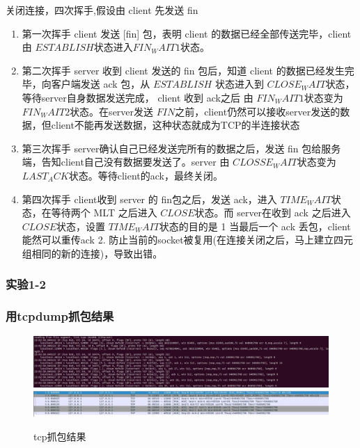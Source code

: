 \documentclass[a4paper,UTF8]{ctexart}
\begin{document}
		\par 关闭连接，四次挥手,假设由 client 先发送 fin
		\begin{enumerate}
		\item 第一次挥手 client 发送 [fin] 包，表明 client 的数据已经全部传送完毕，client 由 $ESTABLISH$状态进入$FIN_WAIT1$状态。
		\item 第二次挥手 server 收到 client 发送的 fin 包后，知道 client 的数据已经发生完毕，向客户端发送 ack 包，从 $ESTABLISH$ 状态进入到 $CLOSE_WAIT$状态，等待server自身数据发送完成， client 收到 ack之后 由 $FIN_WAIT1$状态变为$FIN_WAIT2$状态。在server发送 $FIN$之前，client仍然可以接收server发送的数据，但client不能再发送数据，这种状态就成为TCP的半连接状态
		\item 第三次挥手 server确认自己已经发送完所有的数据之后，发送 fin 包给服务端，告知client自己没有数据要发送了。server 由 $CLOSSE_WAIT$状态变为$LAST_ACK$状态。等待client的ack，最终关闭。
		\item 第四次挥手 client收到 server 的 fin包之后，发送 ack，进入 $TIME_WAIT$状态，在等待两个 MLT 之后进入 $CLOSE$状态。而 server在收到 ack 之后进入 $CLOSE$状态，设置 $TIME_WAIT$状态的目的是 1 当最后一个 ack 丢包，client能然可以重传ack 2. 防止当前的socket被复用(在连接关闭之后，马上建立四元组相同的新的连接)，导致出错。
		\end{enumerate}
	\subsubsection{实验1-2}
		\subsubsection{用tcpdump抓包结果}
			\begin{figure}[htb]
			\includegraphics[scale=0.4]{./resources/4.jpg}
			\includegraphics[scale =0.4]{./resources/5.jpg}
			\caption{tcp抓包结果}
			\end{figure}
\end{document}
